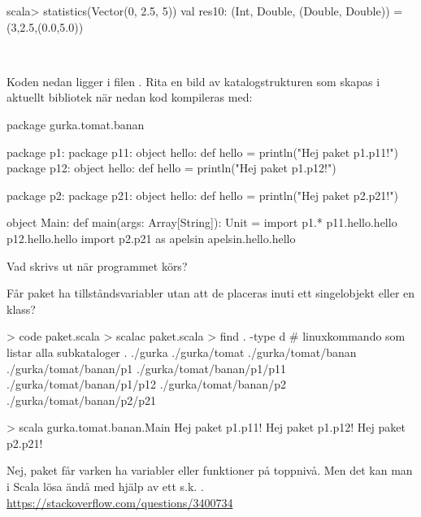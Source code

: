 \begin{REPL}
scala> statistics(Vector(0, 2.5, 5))
val res10: (Int, Double, (Double, Double)) = (3,2.5,(0.0,5.0))
\end{REPL}

\QUESTEND





\QUESTBEGIN

\Task \what~

\Subtask Koden nedan ligger i filen . Rita en bild av katalogstrukturen som skapas i aktuellt bibliotek när nedan kod kompileras med: 
\begin{Code}
package gurka.tomat.banan

package p1:
  package p11:
    object hello:
      def hello = println("Hej paket p1.p11!")
  package p12:
    object hello:
      def hello = println("Hej paket p1.p12!")

package p2:
  package p21:
    object hello:
      def hello = println("Hej paket p2.p21!")

object Main:
  def main(args: Array[String]): Unit =
    import p1.*
    p11.hello.hello
    p12.hello.hello
    import p2.{p21 as apelsin}
    apelsin.hello.hello
\end{Code}

\Subtask Vad skrivs ut när programmet körs?

\Subtask Får paket ha tillståndsvariabler utan att de placeras inuti ett singelobjekt eller en klass?

\SOLUTION

\TaskSolved \what

\SubtaskSolved

\begin{REPL}
> code paket.scala
> scalac paket.scala
> find . -type d         # linuxkommando som listar alla subkataloger
.
./gurka
./gurka/tomat
./gurka/tomat/banan
./gurka/tomat/banan/p1
./gurka/tomat/banan/p1/p11
./gurka/tomat/banan/p1/p12
./gurka/tomat/banan/p2
./gurka/tomat/banan/p2/p21
\end{REPL}

\SubtaskSolved
\begin{REPL}
> scala gurka.tomat.banan.Main
Hej paket p1.p11!
Hej paket p1.p12!
Hej paket p2.p21!
\end{REPL}

\SubtaskSolved Nej, paket får varken ha variabler eller funktioner på toppnivå. Men det kan man i Scala lösa ändå med hjälp av ett s.k. . \\
 \url{https://stackoverflow.com/questions/3400734}

